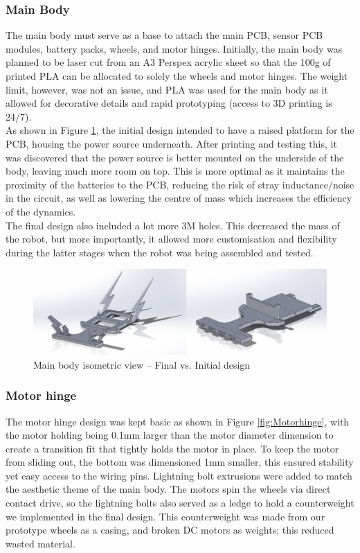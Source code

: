 \documentclass{article}
\begin{document}
\subsubsection{Main Body}
The main body must serve as a base to attach the main PCB, sensor PCB modules, battery packs, wheels, and motor hinges. Initially, the main body was planned to be laser cut from an A3 Perspex acrylic sheet so that the 100g of printed PLA can be allocated to solely the wheels and motor hinges. The weight limit, however, was not an issue, and PLA was used for the main body as it allowed for decorative details and rapid prototyping (access to 3D printing is 24/7).  
\\

As shown in Figure \ref{fig:MainBod}, the initial design intended to have a raised platform for the PCB, housing the power source underneath. After printing and testing this, it was discovered that the power source is better mounted on the underside of the body, leaving much more room on top. This is more optimal as it maintains the proximity of the batteries to the PCB, reducing the risk of stray inductance/noise in the circuit, as well as lowering the centre of mass which increases the efficiency of the dynamics. 
\\

The final design also included a lot more 3M holes. This decreased the mass of the robot, but more importantly, it allowed more customisation and flexibility during the latter stages when the robot was being assembled and tested.  

\begin{figure}[H]
    \centering
    \includegraphics[width=0.7\linewidth]{REPORT/MainBod.png}
    \caption{Main body isometric view – Final vs. Initial design}
    \label{fig:MainBod}
\end{figure}

\subsubsection{Motor hinge}
The motor hinge design was kept basic as shown in Figure \ref{fig:Motorhinge}, with the motor holding being 0.1mm larger than the motor diameter dimension to create a transition fit that tightly holds the motor in place. To keep the motor from sliding out, the bottom was dimensioned 1mm smaller, this ensured stability yet easy access to the wiring pins. Lightning bolt extrusions were added to match the aesthetic theme of the main body. The motors spin the wheels via direct contact drive, so the lightning bolts also served as a ledge to hold a counterweight we implemented in the final design. This counterweight was made from our prototype wheels as a casing, and broken DC motors as weights; this reduced wasted material. 
\end{document}
